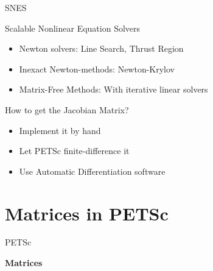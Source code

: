 \begin{frame}{SNES}
  
  \begin{block}{Scalable Nonlinear Equation Solvers}
    \begin{itemize}
     \item Newton solvers: Line Search, Thrust Region
     \item Inexact Newton-methods: Newton-Krylov
     \item Matrix-Free Methods: With iterative linear solvers
    \end{itemize}
  \end{block}
  
  \begin{block}{How to get the Jacobian Matrix?}
    \begin{itemize}
     \item Implement it by hand
     \item Let PETSc finite-difference it
     \item Use Automatic Differentiation software
    \end{itemize}
  \end{block}
\end{frame}



%












%
%

\section{Matrices in PETSc}
\begin{frame}{PETSc}
   \begin{center} \Large \textbf{Matrices} \end{center}
\end{frame}









